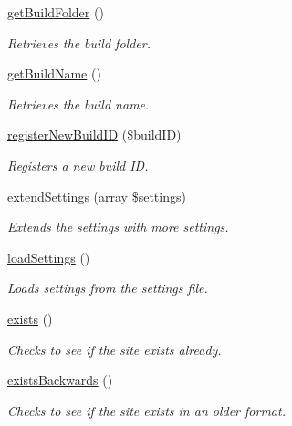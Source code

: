 \begin{DoxyCompactItemize}
\hyperlink{classDrupalSite_a4861be457dff1432fb9a895509cc5da1}{get\-Build\-Folder} ()
\begin{DoxyCompactList}\small\item\em Retrieves the build folder. \end{DoxyCompactList}\item 
\hyperlink{classDrupalSite_a8f70562d6de286532a5fae32e4f4b3b7}{get\-Build\-Name} ()
\begin{DoxyCompactList}\small\item\em Retrieves the build name. \end{DoxyCompactList}\item 
\hyperlink{classDrupalSite_a1f852dbb2fc780a545c34051894371b0}{register\-New\-Build\-I\-D} (\$build\-I\-D)
\begin{DoxyCompactList}\small\item\em Registers a new build I\-D. \end{DoxyCompactList}\item 
\hyperlink{classDrupalSite_a61b5a30d92860c3739650f59dc7bbbb8}{extend\-Settings} (array \$settings)
\begin{DoxyCompactList}\small\item\em Extends the settings with more settings. \end{DoxyCompactList}\item 
\hyperlink{classDrupalSite_a5d4a34516300037bce7148da096bc1e3}{load\-Settings} ()
\begin{DoxyCompactList}\small\item\em Loads settings from the settings file. \end{DoxyCompactList}\item 
\hyperlink{classDrupalSite_a607caaf2f7e4124c228538e8f6e1b297}{exists} ()
\begin{DoxyCompactList}\small\item\em Checks to see if the site exists already. \end{DoxyCompactList}\item 
\hyperlink{classDrupalSite_a5a8309bdbbc44366a003eb945817d174}{exists\-Backwards} ()
\begin{DoxyCompactList}\small\item\em Checks to see if the site exists in an older format. \end{DoxyCompactList}\end{DoxyCompactItemize}
